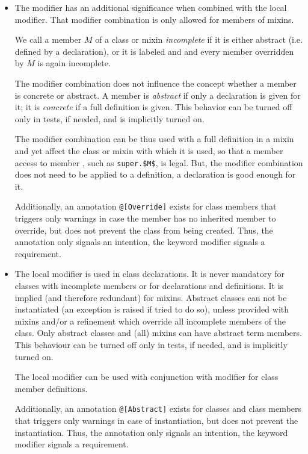 \begin{itemize}
\item
The  modifier has an additional significance when combined with the  local modifier. That modifier combination is only allowed for members of mixins. 

We call a member $M$ of a class or mixin {\em incomplete} if it is either abstract (i.e. defined by a declaration), or it is labeled  and  and every member overridden by $M$ is again incomplete. 

The  modifier combination does not influence the concept whether a member is concrete or abstract. A member is {\em abstract} if only a declaration is given for it; it is {\em concrete} if a full definition is given. This behavior can be turned off only in tests, if needed, and is implicitly turned on. 

The  modifier combination can be thus used with a full definition in a mixin and yet affect the class or mixin with which it is used, so that a member access to member , such as \lstinline!super.$M$!, is legal. But, the  modifier combination does not need to be applied to a definition, a declaration is good enough for it. 

Additionally, an annotation \lstinline!@[Override]! exists for class members that triggers only warnings in case the member has no inherited member to override, but does not prevent the class from being created. Thus, the annotation only signals an intention, the keyword modifier signals a requirement. 

\item
The  local modifier is used in class declarations. It is never mandatory for classes with incomplete members or for declarations and definitions. It is implied (and therefore redundant) for mixins. Abstract classes can not be instantiated (an exception is raised if tried to do so), unless provided with mixins and/or a refinement which override all incomplete members of the class. Only abstract classes and (all) mixins can have abstract term members. This behaviour can be turned off only in tests, if needed, and is implicitly turned on. 

The  local modifier can be used with conjunction with  modifier for class member definitions. 

Additionally, an annotation \lstinline!@[Abstract]! exists for classes and class members that triggers only warnings in case of instantiation, but does not prevent the instantiation. Thus, the annotation only signals an intention, the keyword modifier signals a requirement. 


\end{itemize}

